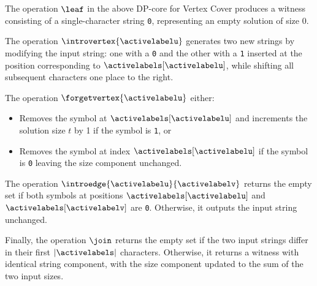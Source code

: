 The operation $\leaf$ in the above DP-core for {\sc Vertex Cover} produces a witness consisting of a single-character string \texttt{0}, representing an empty solution of size 0.

The operation $\introvertex{\activelabelu}$ generates two new strings by modifying the input string: one with a \texttt{0} and the other with a \texttt{1} inserted at the position corresponding to $\activelabels[\activelabelu]$, while shifting all subsequent characters one place to the right.

The operation $\forgetvertex{\activelabelu}$ either:
\begin{itemize}
    \item Removes the symbol at $\activelabels[\activelabelu]$ and increments the solution size \(t\) by 1 if the symbol is \texttt{1}, or
    \item Removes the symbol at index $\activelabels[\activelabelu]$ if the symbol is \texttt{0} leaving the size component unchanged.
\end{itemize}

The operation $\introedge{\activelabelu}{\activelabelv}$ returns the empty set if both symbols at positions $\activelabels[\activelabelu]$ and $\activelabels[\activelabelv]$ are \texttt{0}. Otherwise, it outputs the input string unchanged.

Finally, the operation $\join$ returns the empty set if the two input strings differ in their first $|\activelabels|$ characters. Otherwise, it returns a witness with identical string component, with the size component updated to the sum of the two input sizes.





